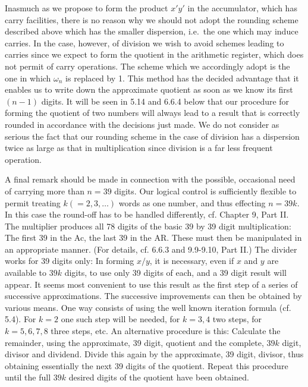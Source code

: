 \documentclass[12pt]{amsart}
\begin{document}
Inasmuch as we propose to form the product $x'y'$ in the accumulator, which has carry facilities, there is no reason why we should not adopt the rounding scheme described above which has the smaller dispersion, i.e.\ the one which may induce carries. In the case, however, of division we wish to avoid schemes leading to carries since we expect to form the quotient in the arithmetic register, which does not permit of carry operations. The scheme which we accordingly adopt is the one in which $\omega_n$ is replaced by 1. This method has the decided advantage that it enables us to write down the approximate quotient as soon as we know its first $(n - 1)$ digits. It will be seen in 5.14 and 6.6.4 below that our procedure for forming the quotient of two numbers will always lead to a result that is correctly rounded in accordance with the decisions just made. We do not consider as serious the fact that our rounding scheme in the case of division has a dispersion twice as large as that in multiplication since division is a far less frequent operation.

A final remark should be made in connection with the possible, occasional need of carrying more than $n = 39$ digits. Our logical control is sufficiently flexible to permit treating $k (= 2, 3, \dots)$ words as one number, and thus effecting $n = 39k$. In this case the round-off has to be handled differently, cf. Chapter 9, Part II. The multiplier produces all 78 digits of the basic 39 by 39 digit multiplication: The first 39 in the Ac, the last 39 in the AR. These must then be manipulated in an appropriate manner. (For details, cf. 6.6.3 and 9.9-9.10, Part II.) The divider works for 39 digits only: In forming $x/y$, it is necessary, even if $x$ and $y$ are available to $39k$ digits, to use only 39 digits of each, and a 39 digit result will appear. It seems most convenient to use this result as the first step of a series of successive approximations. The successive improvements can then be obtained by various means. One way consists of using the well known iteration formula (cf. 5.4). For $k = 2$ one such step will be needed, for $k = 3, 4$ two steps, for $k = 5, 6, 7, 8$ three steps, etc. An alternative procedure is this: Calculate the remainder, using the approximate, 39 digit, quotient and the complete, $39k$ digit, divisor and dividend. Divide this again by the approximate, 39 digit, divisor, thus obtaining essentially the next 39 digits of the quotient. Repeat this procedure until the full $39k$ desired digits of the quotient have been obtained.
\end{document}
